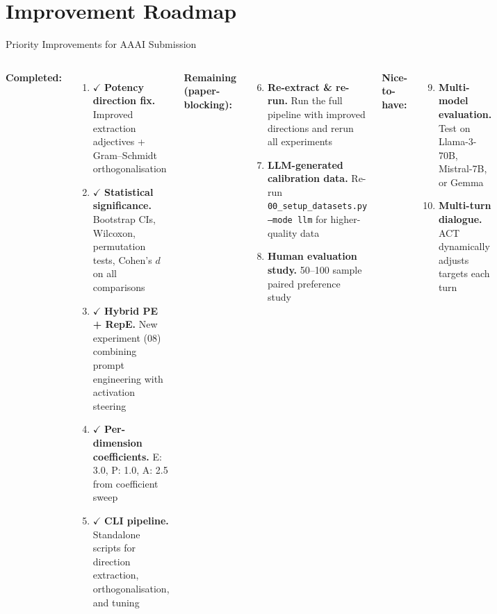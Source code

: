 \documentclass[aspectratio=169,11pt]{beamer}
\begin{document}
\section{Improvement Roadmap}
\begin{frame}{Priority Improvements for AAAI Submission}

\begin{columns}[T]
\textbf{\textcolor{AccentGreen}{Completed:}}
\begin{enumerate}
    \item \textcolor{AccentGreen}{$\checkmark$} \textbf{Potency direction fix.}
    Improved extraction adjectives + Gram--Schmidt orthogonalisation

    \item \textcolor{AccentGreen}{$\checkmark$} \textbf{Statistical significance.}
    Bootstrap CIs, Wilcoxon, permutation tests, Cohen's $d$ on all comparisons

    \item \textcolor{AccentGreen}{$\checkmark$} \textbf{Hybrid PE + RepE.}
    New experiment (08) combining prompt engineering with activation steering

    \item \textcolor{AccentGreen}{$\checkmark$} \textbf{Per-dimension coefficients.}
    E: 3.0, P: 1.0, A: 2.5 from coefficient sweep

    \item \textcolor{AccentGreen}{$\checkmark$} \textbf{CLI pipeline.}
    Standalone scripts for direction extraction, orthogonalisation, and tuning
\end{enumerate}

\textbf{\textcolor{AccentRed}{Remaining (paper-blocking):}}
\begin{enumerate}
    \setcounter{enumi}{5}
    \item \textbf{Re-extract \& re-run.}
    Run the full pipeline with improved directions and rerun all experiments

    \item \textbf{LLM-generated calibration data.}
    Re-run \texttt{00\_setup\_datasets.py --mode llm} for higher-quality data

    \item \textbf{Human evaluation study.}
    50--100 sample paired preference study
\end{enumerate}

\bigskip

\textbf{\textcolor{AccentOrange}{Nice-to-have:}}
\begin{enumerate}
    \setcounter{enumi}{8}
    \item \textbf{Multi-model evaluation.}
    Test on Llama-3-70B, Mistral-7B, or Gemma

    \item \textbf{Multi-turn dialogue.}
    ACT dynamically adjusts targets each turn
\end{enumerate}
\end{columns}
\end{frame}
\end{document}
